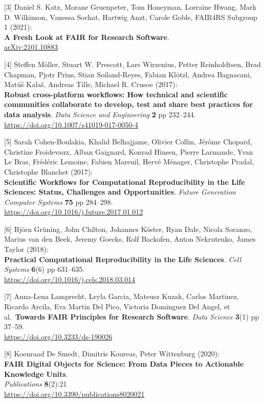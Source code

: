 {[}3{]} Daniel S. Katz, Morane Gruenpeter, Tom Honeyman, Lorraine Hwang,
Mark D. Wilkinson, Vanessa Sochat, Hartwig Anzt, Carole Goble, FAIR4RS
Subgroup 1 (2021):\\
\textbf{A Fresh Look at FAIR for Research Software}.\\
\href{https://arxiv.org/abs/2101.10883}{arXiv:2101.10883}

{[}4{]} Steffen Möller, Stuart W. Prescott, Lars Wirzenius, Petter
Reinholdtsen, Brad Chapman, Pjotr Prins, Stian Soiland-Reyes, Fabian
Klötzl, Andrea Bagnacani, Matúš Kalaš, Andreas Tille, Michael R. Crusoe
(2017):\\
\textbf{Robust cross-platform workflows: How technical and scientific
communities collaborate to develop, test and share best practices for
data analysis}. \emph{Data Science and Engineering} \textbf{2} pp
232--244.\\
\url{https://doi.org/10.1007/s41019-017-0050-4}

{[}5{]} Sarah Cohen-Boulakia, Khalid Belhajjame, Olivier Collin, Jérôme
Chopard, Christine Froidevaux, Alban Gaignard, Konrad Hinsen, Pierre
Larmande, Yvan Le Bras, Frédéric Lemoine, Fabien Mareuil, Hervé Ménager,
Christophe Pradal, Christophe Blanchet (2017):\\
\textbf{Scientific Workflows for Computational Reproducibility in the
Life Sciences: Status, Challenges and Opportunities}. \emph{Future
Generation Computer Systems} \textbf{75} pp 284--298.\\
\url{https://doi.org/10.1016/j.future.2017.01.012}

{[}6{]} Björn Grüning, John Chilton, Johannes Köster, Ryan Dale, Nicola
Soranzo, Marius van den Beek, Jeremy Goecks, Rolf Backofen, Anton
Nekrutenko, James Taylor (2018):\\
\textbf{Practical Computational Reproducibility in the Life Sciences}.
\emph{Cell Systems} \textbf{6}(6) pp 631--635.\\
\url{https://doi.org/10.1016/j.cels.2018.03.014}

{[}7{]} Anna-Lena Lamprecht, Leyla Garcia, Mateusz Kuzak, Carlos
Martinez, Ricardo Arcila, Eva Martin Del Pico, Victoria Dominguez Del
Angel, et al.~\textbf{Towards FAIR Principles for Research Software}.
\emph{Data Science} \textbf{3}(1) pp 37--59.\\
\url{https://doi.org/10.3233/ds-190026}

{[}8{]} Koenraad De Smedt, Dimitris Koureas, Peter Wittenburg (2020):\\
\textbf{FAIR Digital Objects for Science: From Data Pieces to Actionable
Knowledge Units}.\\
\emph{Publications} \textbf{8}(2):21\\
\url{https://doi.org/10.3390/publications8020021}

